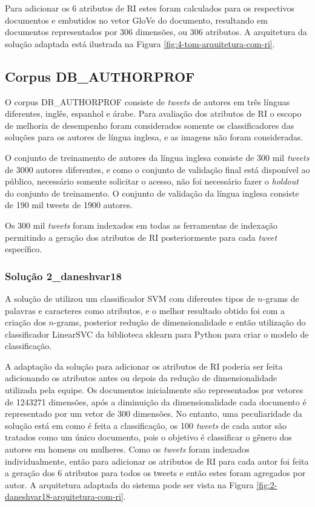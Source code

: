 				
				
				Para adicionar os 6 atributos de RI estes foram calculados para os respectivos documentos e embutidos no vetor GloVe do documento, resultando em documentos representados por 306 dimensões, ou 306 atributos.
				A arquitetura da solução adaptada está ilustrada na Figura \ref{fig:4-tom-arquitetura-com-ri}.

		\subsection{Corpus DB\_AUTHORPROF}
			O corpus DB\_AUTHORPROF consiste de \textit{tweets} de autores em três línguas diferentes, inglês, espanhol e árabe.
			Para avaliação dos atributos de RI o escopo de melhoria de desempenho foram considerados somente os classificadores das soluções para os autores de língua inglesa, e as imagens não foram consideradas.

			O conjunto de treinamento de autores da língua inglesa consiste de 300 mil \textit{tweets} de 3000 autores diferentes, e como o conjunto de validação final está disponível ao público, necessário somente solicitar o acesso, não foi necessário fazer o \textit{holdout} do conjunto de treinamento.
			O conjunto de validação da língua inglesa consiste de 190 mil tweets de 1900 autores.

			Os 300 mil \textit{tweets} foram indexados em todas as ferramentas de indexação permitindo a geração dos atributos de RI posteriormente para cada \textit{tweet} específico.

			\subsubsection{Solução 2\_daneshvar18}
				A solução de  utilizou um classificador SVM com diferentes tipos de $n$-grams de palavras e caracteres como atributos, e o melhor resultado obtido foi com a criação dos $n$-grams, posterior redução de dimensionalidade e então utilização do classificador LinearSVC da biblioteca sklearn para Python para criar o modelo de classificação.

				A adaptação da solução para adicionar os atributos de RI poderia ser feita adicionando os atributos antes ou depois da redução de dimensionalidade utilizada pela equipe.
				Os documentos inicialmente são representados por vetores de 1243271 dimensões, após a diminuição da dimensionalidade cada documento é representado por um vetor de 300 dimensões.
				No entanto, uma peculiaridade da solução está em como é feita a classificação, os 100 \textit{tweets} de cada autor são tratados como um único documento, pois o objetivo é classificar o gênero dos autores em homens ou mulheres.
				Como os \textit{tweets} foram indexados individualmente, então para adicionar os atributos de RI para cada autor foi feita a geração dos 6 atributos para todos os tweets e então estes foram agregados por autor.
				A arquitetura adaptada do sistema pode ser vista na Figura \ref{fig:2-daneshvar18-arquitetura-com-ri}.

